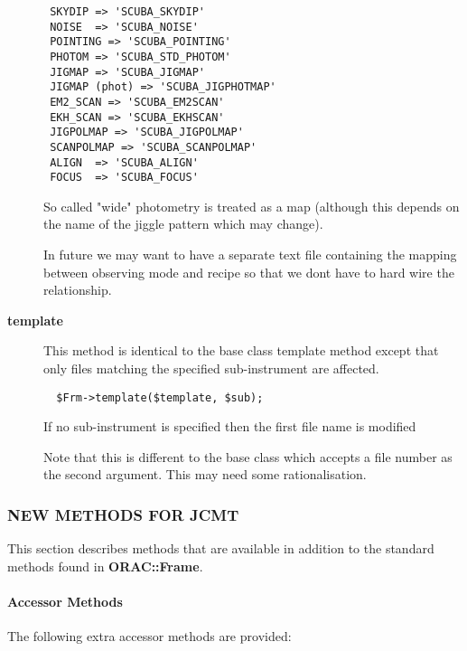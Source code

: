 \begin{description}
\begin{verbatim}
 SKYDIP => 'SCUBA_SKYDIP'
 NOISE  => 'SCUBA_NOISE'
 POINTING => 'SCUBA_POINTING'
 PHOTOM => 'SCUBA_STD_PHOTOM'
 JIGMAP => 'SCUBA_JIGMAP'
 JIGMAP (phot) => 'SCUBA_JIGPHOTMAP'
 EM2_SCAN => 'SCUBA_EM2SCAN'
 EKH_SCAN => 'SCUBA_EKHSCAN'
 JIGPOLMAP => 'SCUBA_JIGPOLMAP'
 SCANPOLMAP => 'SCUBA_SCANPOLMAP'
 ALIGN  => 'SCUBA_ALIGN'
 FOCUS  => 'SCUBA_FOCUS'
\end{verbatim}


So called "wide" photometry is treated as a map (although this
depends on the name of the jiggle pattern which may change).



In future we may want to have a separate text file containing
the mapping between observing mode and recipe so that
we dont have to hard wire the relationship.


\item[\textbf{template}] \mbox{}

This method is identical to the base class template method
except that only files matching the specified sub-instrument
are affected.

\begin{verbatim}
  $Frm->template($template, $sub);
\end{verbatim}


If no sub-instrument is specified then the first file name
is modified



Note that this is different to the base class which accepts
a file number as the second argument. This may need some
rationalisation.

\end{description}
\subsubsection*{NEW METHODS FOR JCMT\label{ORAC::Frame::JCMT_NEW_METHODS_FOR_JCMT}}


This section describes methods that are available in addition
to the standard methods found in \textbf{ORAC::Frame}.

\paragraph*{Accessor Methods\label{ORAC::Frame::JCMT_Accessor_Methods}}


The following extra accessor methods are provided:

